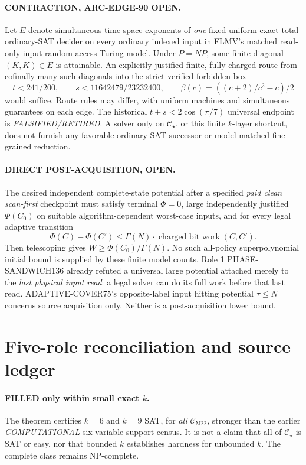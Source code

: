 \documentclass[11pt]{article}
\newcommand{\CM}{\mathcal C_{\mathrm{M22}}}
\newcommand{\CS}{\mathcal C_{\star}}
\begin{document}
\paragraph{CONTRACTION, ARC-EDGE-90 OPEN.}
Let \(E\) denote simultaneous time-space exponents of \emph{one} fixed uniform exact total ordinary-SAT decider on every ordinary indexed input in FLMV's matched read-only-input random-access Turing model. Under \(P=NP\), some finite diagonal \((K,K)\in E\) is attainable. An explicitly justified finite, fully charged route from cofinally many such diagonals into the strict verified forbidden box
\[
t<241/200,\qquad s<11642479/23232400,\qquad
\beta(c)=((c+2)/c^2-c)/2
\]
would suffice. Route rules may differ, with uniform machines and simultaneous guarantees on each edge. The historical \(t+s<2\cos(\pi/7)\) universal endpoint is \emph{FALSIFIED/RETIRED}. A solver only on \(\CS\), or this finite \(k\)-layer shortcut, does not furnish any favorable ordinary-SAT successor or model-matched fine-grained reduction.

\paragraph{DIRECT POST-ACQUISITION, OPEN.}
The desired independent complete-state potential after a specified \emph{paid clean scan-first} checkpoint must satisfy terminal \(\Phi=0\), large independently justified \(\Phi(C_0)\) on suitable algorithm-dependent worst-case inputs, and for every legal adaptive transition
\[
\Phi(C)-\Phi(C')\le \Gamma(N)\cdot\operatorname{charged\_bit\_work}(C,C').
\]
Then telescoping gives \(W\ge\Phi(C_0)/\Gamma(N)\). No such all-policy superpolynomial initial bound is supplied by these finite model counts. Role 1 PHASE-SANDWICH136 already refuted a universal large potential attached merely to the \emph{last physical input read}: a legal solver can do its full work before that last read. ADAPTIVE-COVER75's opposite-label input hitting potential \(\tau\le N\) concerns source acquisition only. Neither is a post-acquisition lower bound.

\section{Five-role reconciliation and source ledger}
\paragraph{FILLED only within small exact \(k\).}
The theorem certifies \(k=6\) and \(k=9\) SAT, for \emph{all} \(\CM\), stronger than the earlier \emph{COMPUTATIONAL} six-variable support census. It is not a claim that all of \(\CS\) is SAT or easy, nor that bounded \(k\) establishes hardness for unbounded \(k\). The complete class remains NP-complete.
\end{document}
